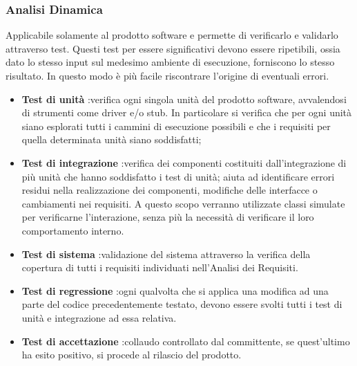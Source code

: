 \subsubsection{Analisi Dinamica}
Applicabile solamente al prodotto software e permette di verificarlo e validarlo attraverso test. Questi test per essere significativi devono essere ripetibili, ossia dato lo stesso input sul medesimo ambiente di esecuzione, forniscono lo stesso risultato. In questo modo è più facile riscontrare l'origine di eventuali errori.
\begin{itemize}
\item\textbf{Test di unità} :verifica ogni singola unità del prodotto software, avvalendosi di strumenti come driver e/o stub. In particolare si verifica che per ogni unità siano esplorati tutti i cammini di esecuzione possibili e che i requisiti per quella determinata unità siano soddisfatti;
\item\textbf{Test di integrazione} :verifica dei componenti costituiti dall'integrazione di più unità che hanno soddisfatto i test di unità; aiuta ad identificare errori residui nella realizzazione dei componenti, modifiche delle interfacce o cambiamenti nei requisiti. A questo scopo verranno utilizzate classi simulate per verificarne l'interazione, senza più la necessità di verificare il loro comportamento interno.
\item\textbf{Test di sistema} :validazione del sistema attraverso la verifica della copertura di tutti i requisiti individuati nell'Analisi dei Requisiti.
\item\textbf{Test di regressione} :ogni qualvolta che si applica una modifica ad una parte del codice precedentemente testato, devono essere svolti tutti i test di unità e integrazione ad essa relativa.
\item\textbf{Test di accettazione} :collaudo controllato dal committente, se quest'ultimo ha esito positivo, si procede al rilascio del prodotto.

\end{itemize}
	\pagebreak
